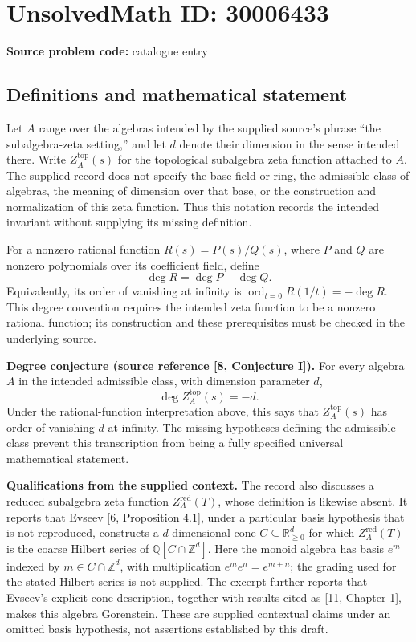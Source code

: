 \documentclass[11pt]{article}
\begin{document}
\section*{UnsolvedMath ID: 30006433}
\textbf{Source problem code:} catalogue entry
\subsection{Definitions and mathematical statement}
Let \(A\) range over the algebras intended by the supplied source's phrase ``the subalgebra-zeta setting,'' and let \(d\) denote their dimension in the sense intended there. Write \(Z_A^{\mathrm{top}}(s)\) for the topological subalgebra zeta function attached to \(A\). The supplied record does not specify the base field or ring, the admissible class of algebras, the meaning of dimension over that base, or the construction and normalization of this zeta function. Thus this notation records the intended invariant without supplying its missing definition.

For a nonzero rational function \(R(s)=P(s)/Q(s)\), where \(P\) and \(Q\) are nonzero polynomials over its coefficient field, define
\[
\deg R=\deg P-\deg Q.
\]
Equivalently, its order of vanishing at infinity is \(\operatorname{ord}_{t=0}R(1/t)=-\deg R\). This degree convention requires the intended zeta function to be a nonzero rational function; its construction and these prerequisites must be checked in the underlying source.

\textbf{Degree conjecture (source reference [8, Conjecture I]).} For every algebra \(A\) in the intended admissible class, with dimension parameter \(d\),
\[
\deg Z_A^{\mathrm{top}}(s)=-d.
\]
Under the rational-function interpretation above, this says that \(Z_A^{\mathrm{top}}(s)\) has order of vanishing \(d\) at infinity. The missing hypotheses defining the admissible class prevent this transcription from being a fully specified universal mathematical statement.

\textbf{Qualifications from the supplied context.} The record also discusses a reduced subalgebra zeta function \(Z_A^{\mathrm{red}}(T)\), whose definition is likewise absent. It reports that Evseev [6, Proposition 4.1], under a particular basis hypothesis that is not reproduced, constructs a \(d\)-dimensional cone \(C\subseteq\mathbb R_{\geq0}^{d}\) for which \(Z_A^{\mathrm{red}}(T)\) is the coarse Hilbert series of \(\mathbb Q[C\cap\mathbb Z^d]\). Here the monoid algebra has basis \(e^m\) indexed by \(m\in C\cap\mathbb Z^d\), with multiplication \(e^m e^n=e^{m+n}\); the grading used for the stated Hilbert series is not supplied. The excerpt further reports that Evseev's explicit cone description, together with results cited as [11, Chapter 1], makes this algebra Gorenstein. These are supplied contextual claims under an omitted basis hypothesis, not assertions established by this draft.
\end{document}
